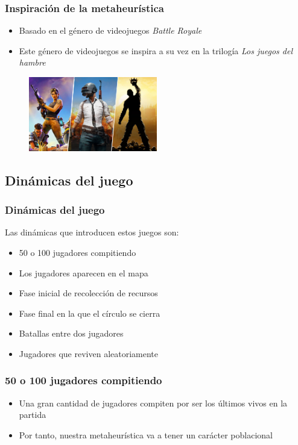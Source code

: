 \documentclass{beamer}
\begin{document}
\begin{frame}
    \frametitle{Inspiración de la metaheurística}

    \begin{itemize}
        \item Basado en el género de videojuegos \emph{Battle Royale}
        \item Este género de videojuegos se inspira a su vez en la trilogía \emph{Los juegos del hambre}
    \end{itemize}

    \begin{figure}
        \centering
        \includegraphics[width=0.5\textwidth]{portada}
    \end{figure}

\end{frame}

\subsection{Dinámicas del juego}
\begin{frame}
    \frametitle{Dinámicas del juego}
    Las dinámicas que introducen estos juegos son:

    \begin{itemize}
        \item 50 o 100 jugadores compitiendo
        \item Los jugadores aparecen en el mapa
        \item Fase inicial de recolección de recursos
        \item Fase final en la que el círculo se cierra
        \item Batallas entre dos jugadores
        \item Jugadores que reviven aleatoriamente
    \end{itemize}
\end{frame}

\begin{frame}
    \frametitle{50 o 100 jugadores compitiendo}

    \begin{itemize}
        \item Una gran cantidad de jugadores compiten por ser los últimos vivos en la partida
        \item Por tanto, nuestra metaheurística va a tener un carácter poblacional
    \end{itemize}
\end{frame}
\end{document}
